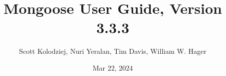 \title{Mongoose User Guide, Version 3.3.3}
\author{Scott Kolodziej, Nuri Yeralan, Tim Davis, William W. Hager}
\date{Mar 22, 2024}
